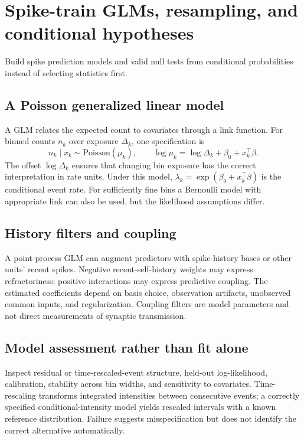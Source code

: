 \chapter{Spike-train GLMs, resampling, and conditional hypotheses}\label{ch:glm}
\begin{readergoal}Build spike prediction models and valid null tests from conditional probabilities instead of selecting statistics first.\end{readergoal}
\section{A Poisson generalized linear model}
A GLM relates the expected count to covariates through a link function. For binned counts $n_k$ over exposure $\Delta_k$, one specification is
\[n_k\mid x_k\sim\mathrm{Poisson}(\mu_k),\qquad\log\mu_k=\log\Delta_k+\beta_0+x_k^\top\beta.\]
The offset $\log\Delta_k$ ensures that changing bin exposure has the correct interpretation in rate units. Under this model, $\lambda_k=\exp(\beta_0+x_k^\top\beta)$ is the conditional event rate. For sufficiently fine bins a Bernoulli model with appropriate link can also be used, but the likelihood assumptions differ.

\section{History filters and coupling}
A point-process GLM can augment predictors with spike-history bases or other units' recent spikes. Negative recent-self-history weights may express refractoriness; positive interactions may express predictive coupling. The estimated coefficients depend on basis choice, observation artifacts, unobserved common inputs, and regularization. Coupling filters are model parameters and not direct measurements of synaptic transmission.

\section{Model assessment rather than fit alone}
Inspect residual or time-rescaled-event structure, held-out log-likelihood, calibration, stability across bin widths, and sensitivity to covariates. Time-rescaling transforms integrated intensities between consecutive events; a correctly specified conditional-intensity model yields rescaled intervals with a known reference distribution. Failure suggests misspecification but does not identify the correct alternative automatically.

